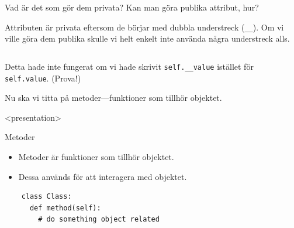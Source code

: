 \begin{exercise}
  Vad är det som gör dem privata?
  Kan man göra publika attribut, hur?
\end{exercise}

Attributen är privata eftersom de börjar med dubbla understreck 
(\texttt{__}).
Om vi ville göra dem publika skulle vi helt enkelt inte använda några 
understreck alls.

\begin{frame}[fragile]
  \inputminted[highlightlines={7,21-22}]{python}{examples/public.py}
\end{frame}

Detta hade inte fungerat om vi hade skrivit \texttt{self.__value}
istället för \texttt{self.value}.
(Prova!)


Nu ska vi titta på metoder---funktioner som tillhör objektet.

\begin{frame}[fragile]
  \begin{onlyenv}<presentation>
  \begin{block}{Metoder}
    \begin{itemize}
      \item Metoder är funktioner som tillhör objektet.
      \item Dessa används för att interagera med objektet.
    \end{itemize}
  \end{block}
  \end{onlyenv}

  \begin{verbatim}
    class Class:
      def method(self):
        # do something object related
  \end{verbatim}
\end{frame}

